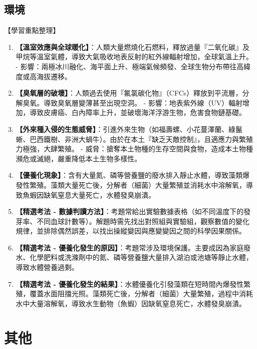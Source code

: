 \documentclass[11pt,a4paper]{article}
\begin{document}
\subsection{環境}
\begin{learningpoints}{【學習重點整理】}
\begin{enumerate}[label=\arabic*.]
  \item \textbf{【溫室效應與全球暖化】}：人類大量燃燒化石燃料，釋放過量『二氧化碳』及甲烷等溫室氣體，導致大氣吸收地表反射的紅外線輻射增加，全球氣溫上升。
  - 影響：兩極冰川融化、海平面上升、極端氣候頻發、全球生物分布帶往高緯度或高海拔遷移。
  \item \textbf{【臭氧層的破壞】}：人類過去使用『氟氯碳化物』（CFCs）釋放到平流層，分解臭氧。導致臭氧層變薄甚至出現空洞。
  - 影響：地表紫外線（UV）輻射增加，導致皮膚癌、白內障率上升，並破壞海洋浮游生物，危害食物鏈基礎。
  \item \textbf{【外來種入侵的生態威脅】}：引進外來生物（如福壽螺、小花蔓澤蘭、綠鬣蜥、巴西鐵樹、非洲大蝸牛）。由於在本土『缺乏天敵控制』，且適應力與繁殖力極強，大肆繁殖。
  - 威脅：搶奪本土物種的生存空間與食物，造成本土物種瀕危或滅絕，嚴重降低本土生物多樣性。
  \item \textbf{【優養化現象】}：含有大量氮、磷等營養鹽的廢水排入靜止水體，導致藻類爆發性繁殖。藻類大量死亡後，分解者（細菌）大量繁殖並消耗水中溶解氧，導致魚蝦因缺氧窒息大量死亡，水體發臭崩潰。
  \item \textbf{【精選考法 - 數據判讀方法】}：考題常給出實驗數據表格（如不同溫度下的發芽率、不同血球計數等）。解題時需先找出對照組與實驗組，觀察數值的變化規律，並排除偶然誤差，以找出操縱變因與應變變因之間的科學因果關係。
  \item \textbf{【精選考法 - 優養化發生的原因】}：考題常涉及環境保護。主要成因為家庭廢水、化學肥料或洗滌劑中的氮、磷等營養鹽大量排入湖泊或池塘等靜止水體，導致水體營養過剩。
  \item \textbf{【精選考法 - 優養化發生的結果】}：水體優養化引發藻類在短時間內爆發性繁殖，覆蓋水面阻擋光照。藻類死亡後，分解者（細菌）大量繁殖，過程中消耗水中大量溶解氧，導致水生動物（魚蝦）因缺氧窒息死亡，水體發臭崩潰。
\end{enumerate}
\end{learningpoints}

\newpage
\section{其他}
\end{document}
